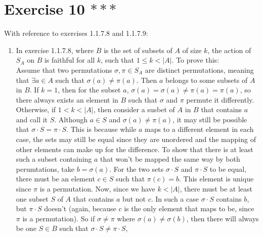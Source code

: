 \documentclass{article}
\begin{document}
    \section*{Exercise 10 $***$}
    With reference to exercises 1.1.7.8 and 1.1.7.9: \\
    \begin{enumerate}[label=\textbf{\alph*.}]
        \item 
            In exercise 1.1.7.8,
            where $B$ is the set of subsets of $A$ of size $k$,
            the action of $S_A$ on $B$ is faithful for all $k$,
            such that $1 \leqslant k < |A|$.
            To prove this: \\
            Assume that two permutations $\sigma, \pi \in S_A$
            are distinct permutations,
            meaning that $\exists a \in A$ such that $\sigma(a) \neq \pi(a)$.
            Then $a$ belongs to some subsets of $A$ in $B$.
            If $k = 1$, then for the subset ${a}$,
            $\sigma({a}) = {\sigma(a)} \neq {\pi(a)} = \pi({a})$,
            so there always exists an element in $B$ such that
            $\sigma$ and $\pi$ permute it differently. \\
            Otherwise, if $1 < k < |A|$,
            then consider a susbet of $A$ in $B$ that contains $a$
            and call it $S$.
            Although $a \in S$ and $\sigma(a) \neq \pi(a)$,
            it may still be possible that $\sigma \cdot S = \pi \cdot S$.
            This is because while $a$ maps to a different element
            in each case,
            the sets may still be equal since they are unordered
            and the mapping of other elements can make up for the difference.
            To show that there is at least such a subset containing $a$
            that won't be mapped the same way by both perumtations,
            take $b = \sigma(a)$.
            For the two sets $\sigma \cdot S$ and $\pi \cdot S$ to be equal,
            there must be an element $c \in S$ such that $\pi(c) = b$.
            This element is unique since $\pi$ is a permutation.
            Now, since we have $k < |A|$,
            there must be at least one subset $S$ of $A$
            that contains $a$ but not $c$.
            In such a case $\sigma \cdot S$ contains $b$,
            but $\pi \cdot S$ doesn't
            (again, because $c$ is the only element that maps to be,
            since $\pi$ is a permutation).
            So if $\sigma \neq \pi$ where $\sigma(a) \neq \sigma(b)$,
            then there will always be one $S \in B$ such that
            $\sigma \cdot S \neq \pi \cdot S$,

\end{enumerate}
\end{document}
